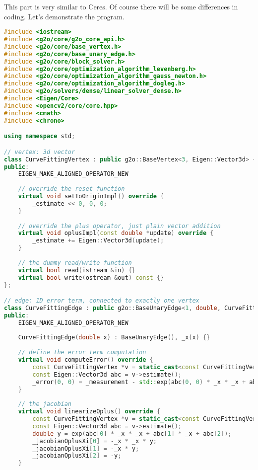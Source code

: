 This part is very similar to Ceres. Of course there will be some differences in coding. Let's demonstrate the program.
\begin{lstlisting}[language=c++,caption=slambook/ch6/g2oCurveFitting.cpp]
#include <iostream>
#include <g2o/core/g2o_core_api.h>
#include <g2o/core/base_vertex.h>
#include <g2o/core/base_unary_edge.h>
#include <g2o/core/block_solver.h>
#include <g2o/core/optimization_algorithm_levenberg.h>
#include <g2o/core/optimization_algorithm_gauss_newton.h>
#include <g2o/core/optimization_algorithm_dogleg.h>
#include <g2o/solvers/dense/linear_solver_dense.h>
#include <Eigen/Core>
#include <opencv2/core/core.hpp>
#include <cmath>
#include <chrono>

using namespace std;

// vertex: 3d vector 
class CurveFittingVertex : public g2o::BaseVertex<3, Eigen::Vector3d> {
public:
    EIGEN_MAKE_ALIGNED_OPERATOR_NEW
    
    // override the reset function
    virtual void setToOriginImpl() override {
        _estimate << 0, 0, 0;
    }
    
    // override the plus operator, just plain vector addition
    virtual void oplusImpl(const double *update) override {
        _estimate += Eigen::Vector3d(update);
    }
    
    // the dummy read/write function
    virtual bool read(istream &in) {}
    virtual bool write(ostream &out) const {}
};

// edge: 1D error term, connected to exactly one vertex
class CurveFittingEdge : public g2o::BaseUnaryEdge<1, double, CurveFittingVertex> {
public:
    EIGEN_MAKE_ALIGNED_OPERATOR_NEW
    
    CurveFittingEdge(double x) : BaseUnaryEdge(), _x(x) {}
    
    // define the error term computation
    virtual void computeError() override {
        const CurveFittingVertex *v = static_cast<const CurveFittingVertex *> (_vertices[0]);
        const Eigen::Vector3d abc = v->estimate();
        _error(0, 0) = _measurement - std::exp(abc(0, 0) * _x * _x + abc(1, 0) * _x + abc(2, 0));
    }
    
    // the jacobian
    virtual void linearizeOplus() override {
        const CurveFittingVertex *v = static_cast<const CurveFittingVertex *> (_vertices[0]);
        const Eigen::Vector3d abc = v->estimate();
        double y = exp(abc[0] * _x * _x + abc[1] * _x + abc[2]);
        _jacobianOplusXi[0] = -_x * _x * y;
        _jacobianOplusXi[1] = -_x * y;
        _jacobianOplusXi[2] = -y;
    }
    

\end{lstlisting}
